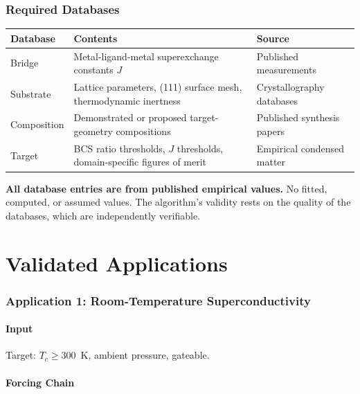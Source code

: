 \documentclass[11pt, a4paper]{article}
\begin{document}
\section{Required Databases}

\begin{center}
\begin{tabular}{@{}lp{7cm}l@{}}
\toprule
\textbf{Database} & \textbf{Contents} & \textbf{Source} \\
\midrule
Bridge & Metal-ligand-metal superexchange constants $J$ &
  Published measurements \\
Substrate & Lattice parameters, (111) surface mesh,
  thermodynamic inertness & Crystallography databases \\
Composition & Demonstrated or proposed target-geometry
  compositions & Published synthesis papers \\
Target & BCS ratio thresholds, $J$ thresholds, domain-specific
  figures of merit & Empirical condensed matter \\
\bottomrule
\end{tabular}
\end{center}

\textbf{All database entries are from published empirical
values.} No fitted, computed, or assumed values. The algorithm's
validity rests on the quality of the databases, which are
independently verifiable.

\newpage
\part{Validated Applications}

\section{Application 1: Room-Temperature Superconductivity}

\subsection{Input}

Target: $T_c \geq 300$~K, ambient pressure, gateable.

\subsection{Forcing Chain}
\end{document}
